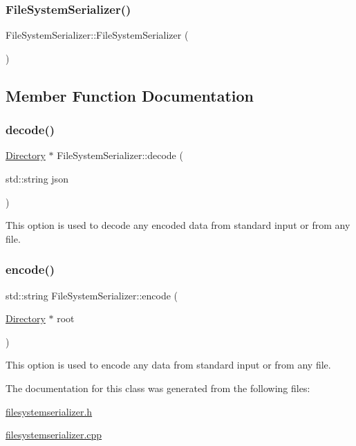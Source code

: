 \subsubsection{\texorpdfstring{File\+System\+Serializer()}{FileSystemSerializer()}}
{\footnotesize\ttfamily File\+System\+Serializer\+::\+File\+System\+Serializer (\begin{DoxyParamCaption}{ }\end{DoxyParamCaption})}



\subsection{Member Function Documentation}
\mbox{\label{class_file_system_serializer_a9a32306fcb9133696c1b5f795eaa1933}} 
\subsubsection{\texorpdfstring{decode()}{decode()}}
{\footnotesize\ttfamily \hyperlink{class_directory}{Directory} $\ast$ File\+System\+Serializer\+::decode (\begin{DoxyParamCaption}\item[{std\+::string}]{json }\end{DoxyParamCaption})\hspace{0.3cm}{\ttfamily [static]}}

This option is used to decode any encoded data from standard input or from any file. \mbox{\label{class_file_system_serializer_aef096d9b5936bddd4beac3dc9181c28f}} 
\subsubsection{\texorpdfstring{encode()}{encode()}}
{\footnotesize\ttfamily std\+::string File\+System\+Serializer\+::encode (\begin{DoxyParamCaption}\item[{\hyperlink{class_directory}{Directory} $\ast$}]{root }\end{DoxyParamCaption})\hspace{0.3cm}{\ttfamily [static]}}

This option is used to encode any data from standard input or from any file. 

The documentation for this class was generated from the following files\+:\begin{DoxyCompactItemize}
\item 
\hyperlink{filesystemserializer_8h}{filesystemserializer.\+h}\item 
\hyperlink{filesystemserializer_8cpp}{filesystemserializer.\+cpp}\end{DoxyCompactItemize}
